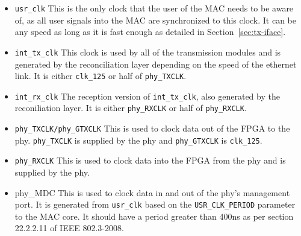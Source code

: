 \documentclass[11pt]{article}
\begin{document}
\begin{itemize}
\item{\texttt{usr\_clk}} This is the only clock that the user of the MAC needs
  to be aware of, as all user signals into the MAC are synchronized to
  this clock.  It can be any speed as long as it is fast enough as
  detailed in Section~\ref{sec:tx-iface}.

\item{\texttt{int\_tx\_clk}} This clock is used by all of the transmission
  modules and is generated by the reconciliation layer depending on
  the speed of the ethernet link. It is either \texttt{clk\_125} or
  half of \texttt{phy\_TXCLK}.

\item{\texttt{int\_rx\_clk}} The reception version of \texttt{int\_tx\_clk},
  also generated by the reconiliation layer.  It is either
  \texttt{phy\_RXCLK} or half of \texttt{phy\_RXCLK}.

\item{\texttt{phy\_TXCLK/phy\_GTXCLK}} This is used to clock data out of the
  FPGA to the phy.  \texttt{phy\_TXCLK} is supplied by the phy and
  \texttt{phy\_GTXCLK} is \texttt{clk\_125}.

\item{\texttt{phy\_RXCLK}} This is used to clock data into the FPGA from the
  phy and is supplied by the phy.

\item{phy\_MDC} This is used to clock data in and out of the phy's
  management port.  It is generated from \texttt{usr\_clk} based on
  the \texttt{USR\_CLK\_PERIOD} parameter to the MAC core.  It should
  have a period greater than 400ns as per section 22.2.2.11 of IEEE
  802.3-2008.
\end{itemize}
\end{document}
